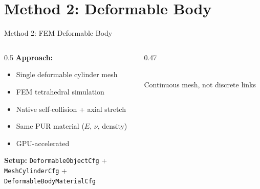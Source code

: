 \documentclass[aspectratio=169]{beamer}
\begin{document}
\section{Method 2: Deformable Body}
\begin{frame}{Method 2: FEM Deformable Body}
\begin{columns}[T]
\begin{column}{0.5\textwidth}
\textbf{Approach:}
\begin{itemize}
    \item Single deformable cylinder mesh
    \item FEM tetrahedral simulation
    \item Native self-collision + axial stretch
    \item Same PUR material ($E$, $\nu$, density)
    \item GPU-accelerated
\end{itemize}
\vspace{0.3cm}
\textbf{Setup:} \texttt{DeformableObjectCfg} +\\
\texttt{MeshCylinderCfg} +\\
\texttt{DeformableBodyMaterialCfg}
\end{column}
\begin{column}{0.47\textwidth}
\centering
{}\\
\small Continuous mesh, not discrete links
\end{column}
\end{columns}
\end{frame}

\end{document}
